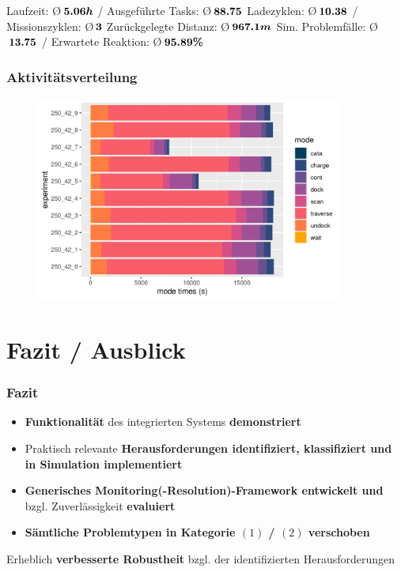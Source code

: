 \documentclass{beamer}
\begin{document}
\begin{frame}
\begin{figure}[H]
\begin{subfigure}[b]{0.49\textwidth}
    \end{subfigure}
  \end{figure}
  \centering
  Laufzeit: \O $\thinspace \boldsymbol{5.06 h}$ / Ausgeführte Tasks: \O $\thinspace \boldsymbol{88.75}$\linebreak
  \centering
  Ladezyklen: \O $\thinspace \boldsymbol{10.38}$ / Missionszyklen: \O $\thinspace \boldsymbol{3}$\linebreak
  \centering
  Zurückgelegte Distanz: \O $\thinspace \boldsymbol{967.1 m}$\linebreak
  \centering
  Sim. Problemfälle: \O $\thinspace \boldsymbol{13.75}$ / Erwartete Reaktion: \O $\thinspace \boldsymbol{95.89 \%}$
\end{frame}

\begin{frame}
  \frametitle{Aktivitätsverteilung}
  \begin{figure}[H]
    \centering
    \includegraphics[width=0.9\textwidth]{img/mode_times.png}
  \end{figure}
\end{frame}

\section{Fazit / Ausblick}

\begin{frame}
  \frametitle{Fazit}
  \begin{itemize}
    \item \textbf{Funktionalität} des integrierten Systems \textbf{demonstriert}
    \item Praktisch relevante \textbf{Herausforderungen identifiziert, klassifiziert und in Simulation implementiert}
    \item \textbf{Generisches Monitoring(-Resolution)-Framework entwickelt und} bzgl. Zuverlässigkeit \textbf{evaluiert}
    \item \textbf{Sämtliche Problemtypen in Kategorie $(1)$ / $(2)$ verschoben}
  \end{itemize}
  \textrightarrow \thinspace Erheblich \textbf{verbesserte Robustheit} bzgl. der identifizierten Herausforderungen
\end{frame}
\end{document}
